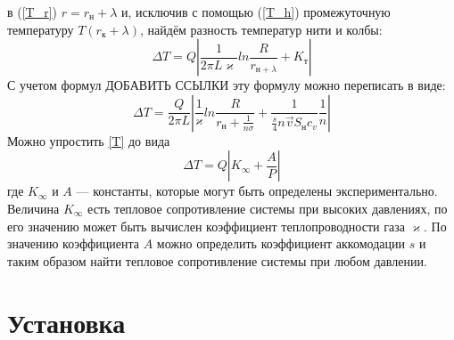 \documentclass[12pt]{article}
\begin{document}
        в (\ref{T_r}) $r = r_{\text{н}} + \lambda$ и, исключив с помощью (\ref{T_h}) промежуточную температуру $T(r_{\text{к}} + \lambda)$, найдём разность температур нити и колбы:
        \begin{equation}
            \Delta T = Q \left|\frac{1}{2\pi L \varkappa}ln\frac{R}{r_{\text{н}+\lambda}} + K_{\text{т}} \right|
        \end{equation}
        С учетом формул ДОБАВИТЬ ССЫЛКИ эту формулу можно переписать в виде:
        \begin{equation}\label{T}
            \Delta T = \frac{Q}{2\pi L}\left| \frac{1}{\varkappa}ln\frac{R}{r_{\text{н}}+\frac{1}{n\sigma}} +\frac{1}{\frac{s}{4} n \vec{v} S_{\text{н}}c_v} \frac{1}{n}\right|
        \end{equation}
        Можно упростить \ref{T} до вида 
        \begin{equation}
            \Delta T = Q \left|K_{\infty} + \frac{A}{P}\right|
        \end{equation}
        где $K_{\infty}$ и $A$ — константы, которые могут быть определены экспериментально. Величина $K_{\infty}$ есть тепловое сопротивление системы при высоких давлениях,
        по его значению может быть вычислен коэффициент теплопроводности газа $\varkappa$. По значению коэффициента $A$ можно определить коэффициент
        аккомодации $s$ и таким образом найти тепловое сопротивление системы при любом давлении.
       







    
    \section{Установка}
    
\end{document}
